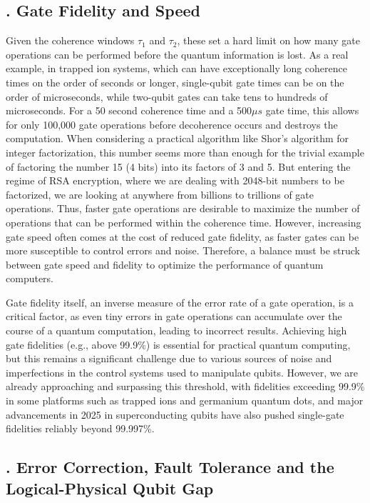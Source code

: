 \documentclass{elbioimp2}
\begin{document}
\subsection{. Gate Fidelity and Speed}
Given the coherence windows $\tau_1$ and $\tau_2$, these set a hard limit on how many gate operations can be performed before the quantum information is lost. As a real example, in trapped ion systems, which can have exceptionally long coherence times on the order of seconds or longer, single-qubit gate times can be on the order of microseconds, while two-qubit gates can take tens to hundreds of microseconds. For a 50 second coherence time and a 500$\mu s$ gate time, this allows for only 100,000 gate operations before decoherence occurs and destroys the computation. When considering a practical algorithm like Shor's algorithm for integer factorization, this number seems more than enough for the trivial example of factoring the number 15 (4 bits) into its factors of 3 and 5. But entering the regime of RSA encryption, where we are dealing with 2048-bit numbers to be factorized, we are looking at anywhere from billions to trillions of gate operations. Thus, faster gate operations are desirable to maximize the number of operations that can be performed within the coherence time. However, increasing gate speed often comes at the cost of reduced gate fidelity, as faster gates can be more susceptible to control errors and noise. Therefore, a balance must be struck between gate speed and fidelity to optimize the performance of quantum computers.

Gate fidelity itself, an inverse measure of the error rate of a gate operation, is a critical factor, as even tiny errors in gate operations can accumulate over the course of a quantum computation, leading to incorrect results. Achieving high gate fidelities (e.g., above 99.9\%) is essential for practical quantum computing, but this remains a significant challenge due to various sources of noise and imperfections in the control systems used to manipulate qubits. However, we are already approaching and surpassing this threshold, with fidelities exceeding 99.9\% in some platforms such as trapped ions and germanium quantum dots\cite{Srinivas_2021,gemanium999}, and major advancements in 2025 in superconducting qubits have also pushed single-gate fidelities reliably beyond 99.997\%\cite{PRXQuantum.5.040342}.

\subsection{. Error Correction, Fault Tolerance and the Logical-Physical Qubit Gap}
\end{document}
